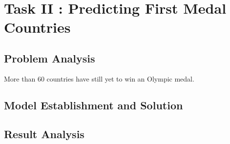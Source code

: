 \section{Task II : Predicting First Medal Countries}
\subsection{Problem Analysis}

More than 60 countries have still yet to win an Olympic medal.
\subsection{Model Establishment and Solution}

\subsection{Result Analysis}
